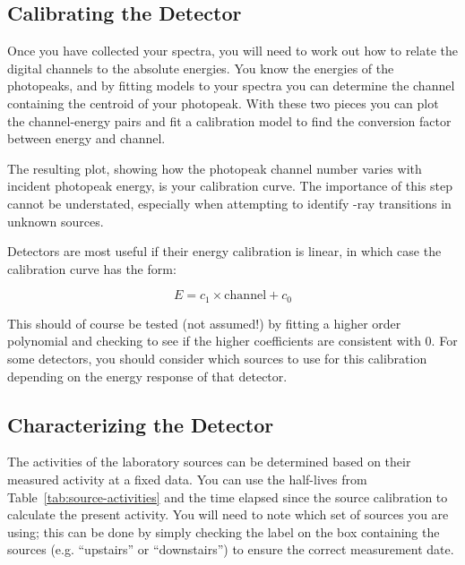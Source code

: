 \documentclass{tufte-book}
\begin{document}
\subsection{Calibrating the Detector}
\label{subsec:he-calib}

Once you have collected your spectra, you will need to work out how to relate the digital channels to the absolute energies. You know the energies of the photopeaks, and by fitting models to your spectra you can determine the channel containing the centroid of your photopeak. With these two pieces you can plot the channel-energy pairs and fit a calibration model to find the conversion factor between energy and channel.

The resulting plot, showing how the photopeak channel number varies with incident photopeak energy, is your calibration curve. The importance of this step cannot be understated, especially when attempting to identify \textgamma-ray transitions in unknown sources.

Detectors are most useful if their energy calibration is linear, in which case the calibration curve has the form:

\begin{equation}
    E = c_1 \times \mathrm{channel} + c_0
\end{equation}

\noindent This should of course be tested (not assumed!) by fitting a higher order polynomial and checking to see if the higher coefficients are consistent with 0. For some detectors, you should consider which sources to use for this calibration depending on the energy response of that detector.

\subsection{Characterizing the Detector}
\label{subsec:he-character}

The activities of the laboratory sources can be determined based on their measured activity at a fixed data. You can use the half-lives from Table~\ref{tab:source-activities} and the time elapsed since the source calibration to calculate the present activity. You will need to note which set of sources you are using; this can be done by simply checking the label on the box containing the sources (e.g. ``upstairs'' or ``downstairs'') to ensure the correct measurement date.

\end{document}
